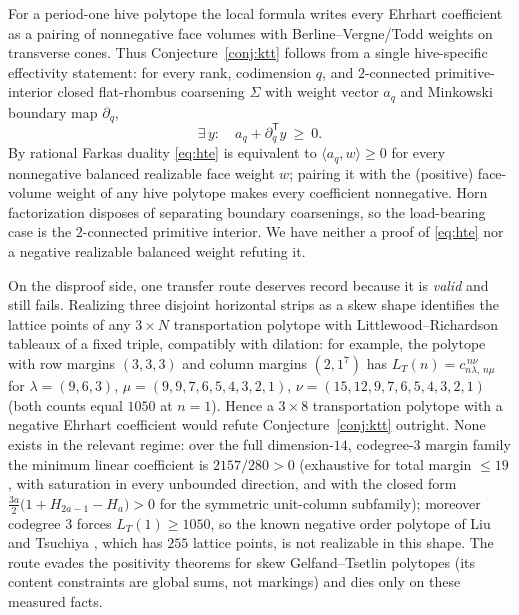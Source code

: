 \documentclass[11pt]{amsart}
\theoremstyle{definition}
\newcommand{\lam}{\lambda}
\begin{document}
For a period-one hive polytope the local formula writes every Ehrhart coefficient
as a pairing of nonnegative face volumes with Berline--Vergne/Todd weights on
transverse cones. Thus Conjecture~\ref{conj:ktt} follows from a single
hive-specific effectivity statement: for every rank, codimension $q$, and
$2$-connected primitive-interior closed flat-rhombus coarsening $\Sigma$ with
weight vector $a_q$ and Minkowski boundary map $\partial_q$,
\begin{equation}\label{eq:hte}
  \exists\, y:\quad a_q+\partial_q^{\mathsf T}y\ \ge\ 0. \tag{HTE}
\end{equation}
By rational Farkas duality \eqref{eq:hte} is equivalent to
$\langle a_q,w\rangle\ge 0$ for every nonnegative balanced realizable face weight
$w$; pairing it with the (positive) face-volume weight of any hive polytope makes
every coefficient nonnegative. Horn factorization \cite{KTT2006,KTTfactor}
disposes of separating boundary coarsenings, so the load-bearing case is the
$2$-connected primitive interior. We have neither a proof of \eqref{eq:hte} nor a
negative realizable balanced weight refuting it.

On the disproof side, one transfer route deserves record because it is
\emph{valid} and still fails. Realizing three disjoint horizontal strips as a
skew shape identifies the lattice points of any $3\times N$ transportation
polytope with Littlewood--Richardson tableaux of a fixed triple, compatibly
with dilation: for example, the polytope with row margins $(3,3,3)$ and column
margins $(2,1^{7})$ has $L_T(n)=c^{\,n\nu}_{n\lam,\,n\mu}$ for
$\lam=(9,6,3)$, $\mu=(9,9,7,6,5,4,3,2,1)$, $\nu=(15,12,9,7,6,5,4,3,2,1)$
(both counts equal $1050$ at $n=1$). Hence a $3\times 8$ transportation
polytope with a negative Ehrhart coefficient would refute
Conjecture~\ref{conj:ktt} outright. None exists in the relevant regime: over
the full dimension-$14$, codegree-$3$ margin family the minimum linear
coefficient is $2157/280>0$ (exhaustive for total margin $\le 19$, with
saturation in every unbounded direction, and with the closed form
$\tfrac{3a}{2}\bigl(1+H_{2a-1}-H_a\bigr)>0$ for the symmetric unit-column
subfamily); moreover codegree $3$ forces $L_T(1)\ge 1050$, so the known
negative order polytope of Liu and Tsuchiya \cite{LiuTsuchiya}, which has
$255$ lattice points, is not realizable in this shape. The route evades the
positivity theorems for skew Gelfand--Tsetlin polytopes (its content
constraints are global sums, not markings) and dies only on these measured
facts.
\end{document}
